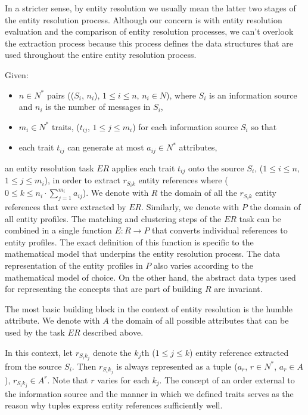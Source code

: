 \documentclass[lettersize,journal]{IEEEtran}
\begin{document}
    In a stricter sense, by entity resolution we usually mean the latter two
    stages of the entity resolution process.
    Although our concern is with entity resolution evaluation and the comparison
    of entity resolution processes, we can't overlook the extraction process
    because this process defines the data structures that are used throughout
    the entire entity resolution process.

    Given:
    \begin{itemize}
        \item $n \in N^*$ pairs (($S_i$, $n_i$), $1 \leq i \leq n$, $n_i \in N$), 
        where $S_i$ is an information source and $n_i$ is the number of messages
        in $S_i$,
        \item $m_i \in N^*$ traits, ($t_{ij}$, $1 \leq j \leq m_i$) for each
        information source $S_i$ so that
        \item each trait $t_{ij}$ can generate at most $a_{ij} \in N^*$
        attributes,
    \end{itemize}
    an entity resolution task $ER$ applies each trait $t_{ij}$ onto the source
    $S_i$, ($1 \leq i \leq n$, $1 \leq j \leq m_i$), in order to extract
    $r_{{S_i}k}$ entity references where
    ($0 \leq k \leq n_i \cdot \sum^{m_i}_{j=1}a_{ij}$).
    We denote with $R$ the domain of all the $r_{{S_i}k}$ entity references that
    were extracted by $ER$.
    Similarly, we denote with $P$ the domain of all entity profiles.
    The matching and clustering steps of the $ER$ task can be combined in a
    single function $E: R \rightarrow P$ that converts individual references to
    entity profiles.
    The exact definition of this function is specific to the mathematical model
    that underpins the entity resolution process.
    The data representation of the entity profiles in $P$ also varies according
    to the mathematical model of choice.
    On the other hand, the abstract data types used for representing the
    concepts that are part of building $R$ are invariant.

    The most basic building block in the context of entity resolution is the
    humble attribute.
    We denote with $A$ the domain of all possible attributes that can be used by
    the task $ER$ described above.

    In this context, let $r_{{S_i}{k_j}}$ denote the $k_j$th ($1 \leq j \leq k$)
    entity reference extracted from the source $S_i$.
    Then $r_{{S_i}{k_j}}$ is always represented as a tuple
    ($a_r$, $r \in N^*$, $a_r \in A$), $r_{{S_i}{k_j}} \in A^r$.
    Note that $r$ varies for each $k_j$.
    The concept of an order external to the information source and the manner in
    which we defined traits serves as the reason why tuples express entity
    references sufficiently well.
\end{document}
